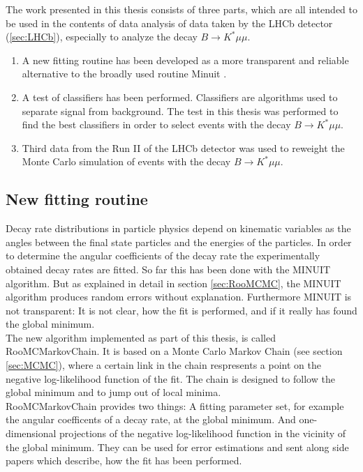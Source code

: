 \documentclass[english]{uzhpub}
\begin{document}
The work presented in this thesis consists of three parts, which are all intended to be used in the contents of data analysis of data taken by the LHCb detector (\ref{sec:LHCb}), especially to analyze the decay $B \rightarrow K^* \mu \mu$.
\begin{enumerate}
  \item A new fitting routine has been developed as a more transparent and reliable alternative to the broadly used routine Minuit \cite{bib:Minuit}.
  \item A test of classifiers has been performed. Classifiers are algorithms used to separate signal from background. The test in this thesis was performed to find the best classifiers in order to select events with the decay $B \rightarrow K^* \mu \mu$.
  \item Third data from the Run II of the LHCb detector was used to reweight the Monte Carlo simulation of events with the decay $B \rightarrow K^* \mu \mu$.
\end{enumerate}





\subsection{New fitting routine}
Decay rate distributions in particle physics depend on kinematic variables as the angles between the final state particles and the energies of the particles. In order to determine the angular coefficients of the decay rate the experimentally obtained decay rates are fitted.
So far this has been done with the MINUIT \cite{bib:Minuit} algorithm. But as explained in detail in section \ref{sec:RooMCMC}, the MINUIT algorithm produces random errors without explanation. Furthermore MINUIT is not transparent: It is not clear, how the fit is performed, and if it really has found the global minimum. \\
The new algorithm implemented as part of this thesis, is called RooMCMarkovChain. It is based on a Monte Carlo Markov Chain (see section \ref{sec:MCMC}), where a certain link in the chain respresents a point on the negative log-likelihood function of the fit. The chain is designed to follow the global minimum and to jump out of local minima. \\
RooMCMarkovChain provides two things: A fitting parameter set, for example the angular coefficents of a decay rate, at the global minimum. And one-dimensional projections of the  negative log-likelihood function in the vicinity of the global minimum. They can be used for error estimations and sent along side papers which describe, how the fit has been performed.
\end{document}
